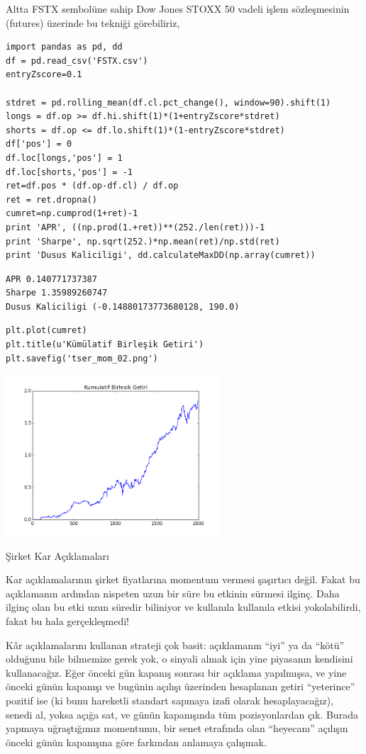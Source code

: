 \documentclass[12pt,fleqn]{article}\usepackage{../../common}
\begin{document}
Altta FSTX sembolüne sahip Dow Jones STOXX 50 vadeli işlem sözleşmesinin
(futures) üzerinde bu tekniği görebiliriz,

\begin{verbatim}
import pandas as pd, dd
df = pd.read_csv('FSTX.csv')
entryZscore=0.1

stdret = pd.rolling_mean(df.cl.pct_change(), window=90).shift(1)
longs = df.op >= df.hi.shift(1)*(1+entryZscore*stdret)
shorts = df.op <= df.lo.shift(1)*(1-entryZscore*stdret)
df['pos'] = 0
df.loc[longs,'pos'] = 1
df.loc[shorts,'pos'] = -1
ret=df.pos * (df.op-df.cl) / df.op
ret = ret.dropna()
cumret=np.cumprod(1+ret)-1
print 'APR', ((np.prod(1.+ret))**(252./len(ret)))-1
print 'Sharpe', np.sqrt(252.)*np.mean(ret)/np.std(ret)
print 'Dusus Kaliciligi', dd.calculateMaxDD(np.array(cumret))
\end{verbatim}

\begin{verbatim}
APR 0.140771737387
Sharpe 1.35989260747
Dusus Kaliciligi (-0.14880173773680128, 190.0)
\end{verbatim}

\begin{verbatim}
plt.plot(cumret)
plt.title(u'Kümülatif Birleşik Getiri')
plt.savefig('tser_mom_02.png')
\end{verbatim}

\includegraphics[height=6cm]{tser_mom_02.png}

Şirket Kar Açıklamaları

Kar açıklamalarının şirket fiyatlarına momentum vermesi şaşırtıcı
değil. Fakat bu açıklamanın ardından nispeten uzun bir süre bu
etkinin sürmesi ilginç. Daha ilginç olan bu etki uzun süredir biliniyor ve
kullanıla kullanıla etkisi yokolabilirdi, fakat bu hala gerçekleşmedi! 

Kâr açıklamalarını kullanan strateji çok basit: açıklamanın ``iyi'' ya da
``kötü'' olduğunu bile bilmemize gerek yok, o sinyali almak için yine
piyasanın kendisini kullanacağız. Eğer önceki gün kapanış sonrası bir
açıklama yapılmışsa, ve yine önceki günün kapanışı ve bugünin açılışı
üzerinden hesaplanan getiri ``yeterince'' pozitif ise (ki bunu hareketli
standart sapmaya izafi olarak hesaplayacağız), senedi al, yoksa açığa sat,
ve günün kapanışında tüm pozisyonlardan çık. Burada yapmaya uğraştığımız
momentumu, bir senet etrafında olan ``heyecanı'' açılışın önceki günün
kapanışına göre farkından anlamaya çalışmak.
\end{document}
